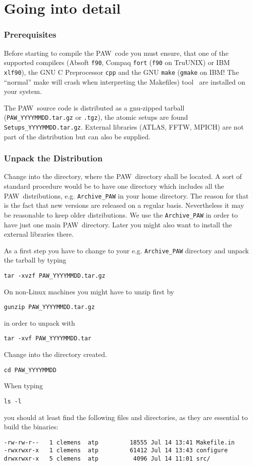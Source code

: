 \documentclass[a4paper,10pt]{article}
\newcommand{\PAW}{\textsc{PAW}}
\begin{document}
\section{Going into detail}

\subsubsection*{Prerequisites}
\label{sub:pre}

Before starting to compile the \PAW\ code you must ensure, that one of the
supported compilers (Absoft \texttt{f90}, Compaq \texttt{fort} (\texttt{f90} on
TruUNIX) or IBM \texttt{xlf90}), the GNU C Preprocessor \texttt{cpp} and the
GNU \texttt{make} (\texttt{gmake} on IBM! The ``normal''  make will crash when
interpreting the Makefiles) tool~\cite{make} are installed on your system.

The \PAW\ source code is distributed as a gnu-zipped tarball
(\texttt{PAW\_YYYYMMDD.tar.gz} or \texttt{.tgz}), the atomic setups are found
\texttt{Setups\_YYYYMMDD.tar.gz}.  External libraries (ATLAS, FFTW, MPICH) are
not part of the distribution but can also be supplied.

\subsubsection*{Unpack the Distribution}
\label{sub:unpack}
Change into the directory, where the \PAW\ directory shall be located.  A sort
of standard procedure would be to have one directory which includes all the
\PAW\ distributions, e.g. \texttt{Archive\_PAW} in your home directory.  The
reason for that is the fact that new versions are released on a regular
basis. Nevertheless it may be reasonable to keep older distributions.  We use
the \texttt{Archive\_PAW} in order to have just one main \PAW\ directory.
Later you might also want to install the external libraries there.


As a first step you have to change to your e.g. \texttt{Archive\_PAW} directory
and unpack the tarball by typing
\begin{verbatim}
tar -xvzf PAW_YYYYMMDD.tar.gz
\end{verbatim}
On non-Linux machines you might have to unzip first by
\begin{verbatim}
gunzip PAW_YYYYMMDD.tar.gz
\end{verbatim}
in order to unpack with
\begin{verbatim}
tar -xvf PAW_YYYYMMDD.tar
\end{verbatim}
Change into the directory created.
\begin{verbatim}
cd PAW_YYYYMMDD
\end{verbatim}
When typing
\begin{verbatim}
ls -l
\end{verbatim}
you should at least find the following files and directories, as they are
essential to build the binaries:
\begin{verbatim}
-rw-rw-r--   1 clemens  atp         18555 Jul 14 13:41 Makefile.in
-rwxrwxr-x   1 clemens  atp         61412 Jul 14 13:43 configure
drwxrwxr-x   5 clemens  atp          4096 Jul 14 11:01 src/
\end{verbatim}
\end{document}
